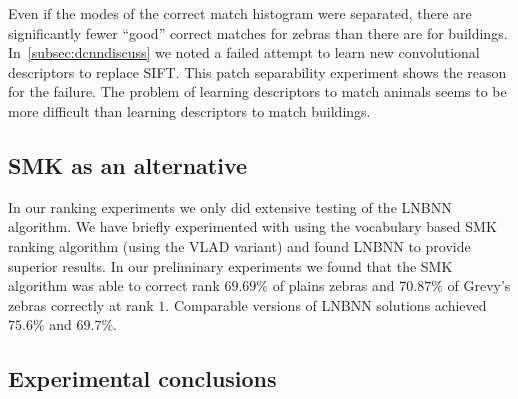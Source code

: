         Even if the modes of the correct match histogram were separated, there are significantly fewer ``good''
          correct matches for zebras than there are for buildings.
        In~\cref{subsec:dcnndiscuss} we noted a failed attempt to learn new convolutional descriptors to replace
          SIFT{}.
        This patch separability experiment shows the reason for the failure.
        The problem of learning descriptors to match animals seems to be more difficult than learning descriptors
          to match buildings.

        \PzVsLibertyPatches{}

        \PzVsLiberty{}


    \subsection{SMK as an alternative}\label{sub:exptsum}  

        In our ranking experiments we only did extensive testing of the LNBNN algorithm.
        We have briefly experimented with using the vocabulary based SMK ranking algorithm (using the VLAD variant)
          and found LNBNN to provide superior results.
        In our preliminary experiments we found that the SMK algorithm was able to correct rank $69.69\percent$ of
          plains zebras and $70.87\percent$ of Grevy's zebras correctly at rank $1$.
        Comparable versions of LNBNN solutions achieved $75.6\percent$ and $69.7\percent$.

    \subsection{Experimental conclusions}\label{sub:exptsum}  

